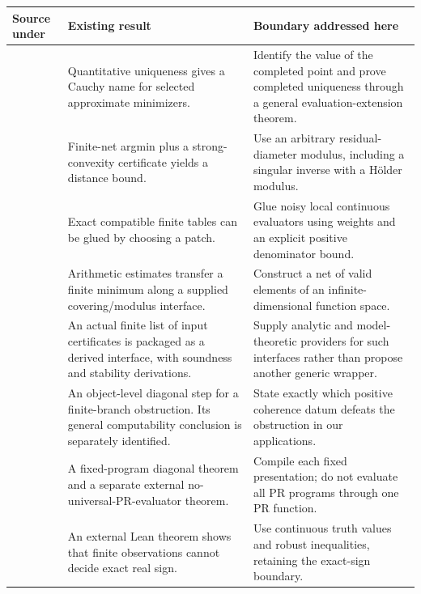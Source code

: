 \begin{longtable}{@{}P{.28\textwidth}P{.32\textwidth}P{.33\textwidth}@{}}
\toprule
Source under  & Existing result & Boundary addressed here\\
\midrule\endhead
{} & Quantitative uniqueness gives a Cauchy name for selected approximate minimizers. & Identify the value of the completed point and prove completed uniqueness through a general evaluation-extension theorem.\\
 & Finite-net argmin plus a strong-convexity certificate yields a distance bound. & Use an arbitrary residual-diameter modulus, including a singular inverse with a H\"older modulus.\\
 & Exact compatible finite tables can be glued by choosing a patch. & Glue noisy local continuous evaluators using weights and an explicit positive denominator bound.\\
 & Arithmetic estimates transfer a finite minimum along a supplied covering/modulus interface. & Construct a net of valid elements of an infinite-dimensional function space.\\
 & An actual finite list of input certificates is packaged as a derived interface, with soundness and stability derivations. & Supply analytic and model-theoretic providers for such interfaces rather than propose another generic wrapper.\\
 & An object-level diagonal step for a finite-branch obstruction. Its general computability conclusion is separately identified. & State exactly which positive coherence datum defeats the obstruction in our applications.\\
 & A fixed-program diagonal theorem and a separate external no-universal-PR-evaluator theorem. & Compile each fixed presentation; do not evaluate all PR programs through one PR function.\\
 & An external Lean theorem shows that finite observations cannot decide exact real sign. & Use continuous truth values and robust inequalities, retaining the exact-sign boundary.\\
\bottomrule
\end{longtable}

